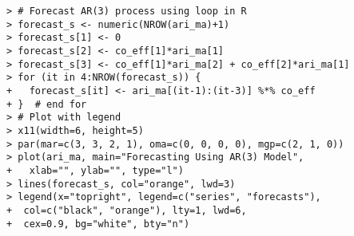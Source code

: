 \documentclass[10pt]{beamer}\usepackage[]{graphicx}\usepackage[]{color}
\makeatletter
\newenvironment{kframe}{%
 \def\at@end@of@kframe{}%
 \ifinner\ifhmode%
  \def\at@end@of@kframe{\end{minipage}}%
  \begin{minipage}{\columnwidth}%
 \fi\fi%
 \def\FrameCommand##1{\hskip\@totalleftmargin \hskip-\fboxsep
 \colorbox{shadecolor}{##1}\hskip-\fboxsep
     \hskip-\linewidth \hskip-\@totalleftmargin \hskip\columnwidth}%
 \MakeFramed {\advance\hsize-\width
   \@totalleftmargin\z@ \linewidth\hsize
   \@setminipage}}%
 {\par\unskip\endMakeFramed%
 \at@end@of@kframe}
\newenvironment{knitrout}{}{} %
\makeatother
\begin{document}
\begin{frame}[fragile,t]{\subsecname}
\begin{block}{}
\begin{columns}[T]
\begin{knitrout}
\begin{kframe}
\begin{verbatim}
> # Forecast AR(3) process using loop in R
> forecast_s <- numeric(NROW(ari_ma)+1)
> forecast_s[1] <- 0
> forecast_s[2] <- co_eff[1]*ari_ma[1]
> forecast_s[3] <- co_eff[1]*ari_ma[2] + co_eff[2]*ari_ma[1]
> for (it in 4:NROW(forecast_s)) {
+   forecast_s[it] <- ari_ma[(it-1):(it-3)] %*% co_eff
+ }  # end for
> # Plot with legend
> x11(width=6, height=5)
> par(mar=c(3, 3, 2, 1), oma=c(0, 0, 0, 0), mgp=c(2, 1, 0))
> plot(ari_ma, main="Forecasting Using AR(3) Model",
+   xlab="", ylab="", type="l")
> lines(forecast_s, col="orange", lwd=3)
> legend(x="topright", legend=c("series", "forecasts"),
+  col=c("black", "orange"), lty=1, lwd=6,
+  cex=0.9, bg="white", bty="n")
\end{verbatim}
\end{kframe}
\end{knitrout}
  \end{columns}
\end{block}

\end{frame}


\end{document}

